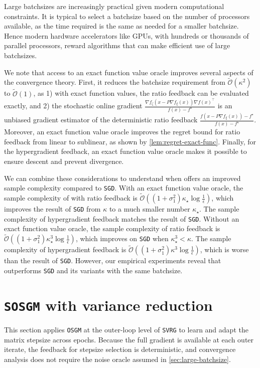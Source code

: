 \documentclass{article}
\theoremstyle{definition}
\DeclareRobustCommand{\namerefc}[2]{\hyperref[#2]{\textcolor{#1}{\nameref*{#2}}}}
\newcommand{\sosgm}{\texttt{SOSGM}}
\newcommand{\osgd}{\namerefc{purple}{alg:sosgm}}
\newcommand{\os}{\texttt{OSGM}}
\newcommand{\svrg}{\texttt{SVRG}}
\newcommand{\sgd}{\texttt{SGD}}
\begin{document}
Large batchsizes are increasingly practical given modern computational constraints.
It is typical to select a batchsize based on the number of processors available, 
as the time required is the same as needed for a smaller batchsize.
Hence modern hardware accelerators like GPUs, with hundreds or thousands of parallel processors, reward algorithms that can make efficient use of large batchsizes.

We note that access to an exact function value oracle improves several aspects of the convergence theory. First, it reduces the batchsize requirement from $\tilde{\mathcal{O}}(\kappa^2)$ to $\tilde{\mathcal{O}}(1)$, as 1) with exact function values, the ratio feedback can be evaluated exactly, and 2) the stochastic online gradient $\tfrac{\nabla f_{\zeta}(x - P \nabla f_{\xi} (x)) \nabla f(x)^\top}{f (x) - f^{\star}}$ is an unbiased gradient estimator of the deterministic ratio feedback $\tfrac{f(x - P \nabla f_{\xi} (x)) - f^\star}{f (x) - f^{\star}}$. Moreover, an exact function value oracle improves the regret bound for ratio feedback from linear to sublinear, as shown by \cref{lem:regret-exact-func}. Finally, for the hypergradient feedback, an exact function value oracle makes it possible to ensure descent and prevent divergence.

We can combine these considerations to understand when {\osgd} offers an improved sample complexity compared to {\sgd}. With an exact function value oracle, 
the sample complexity of {\osgd} with ratio feedback is $\tilde{\mathcal{O}}((1+\sigma_1^2)\kappa_\star \log \tfrac{1}{\epsilon})$, which improves the result of {\sgd} from $\kappa$ to a much smaller number $\kappa_\star$. The sample complexity of hypergradient feedback matches the result of {\sgd}. Without an exact function value oracle, the sample complexity of ratio feedback is $\tilde{\mathcal{O}}((1+\sigma_1^2)\kappa_\star^3 \log \tfrac{1}{\epsilon})$, which improves on {\sgd} when $\kappa_\star^3<\kappa$. The sample complexity of hypergradient feedback is $\tilde{\mathcal{O}}((1+\sigma_1^2)\kappa^3 \log \tfrac{1}{\epsilon})$, which is worse than the result of {\sgd}. However, our empirical experiments reveal that {\osgd} outperforms {\sgd} and its variants with the same batchsize.

\section{{\sosgm} with variance reduction}
\label{sec:vr}

This section applies {\os} at the outer-loop level of {\svrg} to learn and adapt the matrix stepsize across epochs.
Because the full gradient is available at each outer iterate, the feedback for stepsize selection is deterministic, and convergence analysis does not require the noise oracle assumed in \cref{sec:large-batchsize}.
\end{document}
